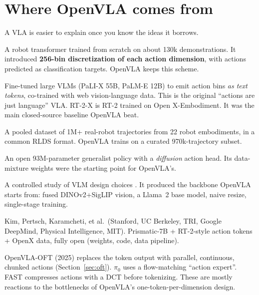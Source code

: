 \documentclass[11pt]{article}
\begin{document}
\section{Where OpenVLA comes from}

A VLA is easier to explain once you know the ideas it borrows.

\begin{description}[style=nextline,leftmargin=1.2em]
\item[RT-1 (Google, 2022)] A robot transformer trained from scratch on about 130k demonstrations. It introduced \textbf{256-bin discretization of each action dimension}, with actions predicted as classification targets. OpenVLA keeps this scheme.
\item[RT-2 (Google DeepMind, 2023)] Fine-tuned large VLMs (PaLI-X 55B, PaLM-E 12B) to emit action bins \emph{as text tokens}, co-trained with web vision-language data. This is the original ``actions are just language'' VLA. RT-2-X is RT-2 trained on Open X-Embodiment. It was the main closed-source baseline OpenVLA beat.
\item[Open X-Embodiment (2023)] A pooled dataset of 1M+ real-robot trajectories from 22 robot embodiments, in a common RLDS format. OpenVLA trains on a curated 970k-trajectory subset.
\item[Octo (2024)] An open 93M-parameter generalist policy with a \emph{diffusion} action head. Its data-mixture weights were the starting point for OpenVLA's.
\item[Prismatic VLMs (2024)] A controlled study of VLM design choices \cite{karamcheti2024prismatic}. It produced the backbone OpenVLA starts from: fused DINOv2+SigLIP vision, a Llama~2 base model, naive resize, single-stage training.
\item[OpenVLA (June 2024)] Kim, Pertsch, Karamcheti, et al.\ (Stanford, UC Berkeley, TRI, Google DeepMind, Physical Intelligence, MIT). Prismatic-7B + RT-2-style action tokens + OpenX data, fully open (weights, code, data pipeline).
\item[Successors] OpenVLA-OFT (2025) \cite{kim2025oft} replaces the token output with parallel, continuous, chunked actions (Section~\ref{sec:oft}). $\pi_0$ uses a flow-matching ``action expert''. FAST compresses actions with a DCT before tokenizing. These are mostly reactions to the bottlenecks of OpenVLA's one-token-per-dimension design.
\end{description}

\end{document}
